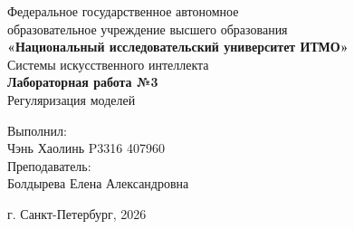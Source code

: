 \begin{titlepage}
    \centering
    Федеральное государственное автономное\\
    образовательное учреждение высшего образования\\
    \textbf{«Национальный исследовательский университет ИТМО»}\\
    \vfill
    Системы искусственного интеллекта\\
    \vspace{0.5\baselineskip}
    \textbf{Лабораторная работа №3}\\
    \vspace{0.5\baselineskip}
    Регуляризация моделей
    \vfill
    \begin{flushright}
    Выполнил:\\
    Чэнь Хаолинь P3316 407960\\
    Преподаватель:\\
    Болдырева Елена Александровна
    \end{flushright}
    \vspace{4\baselineskip}
    \centering
    г. Санкт-Петербург, 2026
\end{titlepage}
